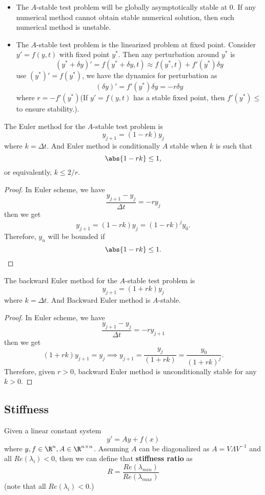 \begin{refsection}
\begin{remark}\hfill
\begin{itemize}
	\item The $A$-stable test problem will be globally asymptotically stable at 0. If any numerical method cannot obtain stable numerical solution, then such numerical method is unstable. 
	\item The $A$-stable test problem is the linearized problem at fixed point. Consider 
	$y' = f(y,t)$ with fixed point $y^*$. Then any perturbation around $y^*$ is
	$$(y^* + \delta y)' = f(y^* + \delta y,t) \approx f(y^*,t) + f'(y^*)\delta y$$
	use $(y^*)' = f(y^*)$, we have the dynamics for perturbation as
	$$(\delta y)' = f'(y^*)\delta y = -r\delta y$$
	where $r = -f'(y^*)$(If $y' = f(y,t)$ has a stable fixed point, then $f'(y^*)\leq $ to ensure stability.). 
\end{itemize}
\end{remark}



\begin{lemma}
The Euler method for the $A$-stable test problem is
$$y_{j+1} = (1 - rk)y_j$$
where $k = \Delta t$. And Euler method is conditionally $A$ stable when $k$ is such that
$$\abs{1-rk}\leq 1,$$
or equivalently, $k\leq 2/ r.$
\end{lemma}
\begin{proof}
In Euler scheme, we have
 $$\frac{y_{j+1} - y_j}{\Delta t} = -ry_j$$
 then we get
 $$y_{j+1} = (1-rk)y_j = (1-rk)^j y_0.$$
 Therefore, $y_n$ will be bounded if $$\abs{1-rk}\leq 1.$$
\end{proof}

\begin{lemma}
	The backward Euler method for the $A$-stable test problem is
	$$y_{j+1} = (1 + rk)y_j$$
	where $k = \Delta t$. And Backward Euler method is $A$-stable.
\end{lemma}
\begin{proof}
	In Euler scheme, we have
	$$\frac{y_{j+1} - y_j}{\Delta t} = -ry_{j+1}$$
	then we get
	$$(1+rk)y_{j+1} = y_j \implies y_{j+1} = \frac{y_j}{(1+rk)} =  \frac{y_0}{(1+rk)^j}.$$
	Therefore, given $r>0$, backward Euler method is unconditionally stable for any $k>0$.
\end{proof}


\subsection{Stiffness}
\begin{definition}
Given a linear constant system
$$y' = Ay + f(x)$$
where $y,f\in \R^n, A\in \R^{n\times n}$. Assuming $A$ can be diagonalized as $A = V\Lambda V^{-1}$ and all $Re(\lambda_i) < 0$, then we can define that \textbf{stiffness ratio} as
$$R = \frac{Re(\lambda_{min})}{Re(\lambda_{max})}$$
(note that all $Re(\lambda_i) < 0$.)	
\end{definition}


\end{refsection}

